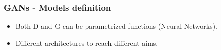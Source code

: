 \documentclass{beamer}
\begin{document}
\begin{frame}
	\frametitle{GANs - Models definition}
	\begin{itemize}
		\item Both D and G can be parametrized functions (Neural Networks).
		\item Different architectures to reach different aims.
		\begin{itemize}
		\end{itemize}
	\end{itemize}
\end{frame}

 
\end{document}
